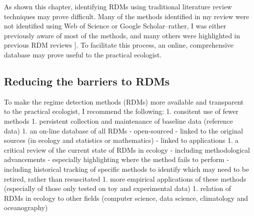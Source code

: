 \documentclass[12pt,twoside,openany]{reedthesis}
\begin{document}
As shown this chapter, identifying RDMs using traditional literature
review techniques may prove difficult. Many of the methods identified in
my review were not identified using Web of Science or Google
Scholar--rather, I was either previously aware of most of the methods,
and many others were highlighted in previous RDM reviews {]}. To
facilitate this process, an online, comprehensive database may prove
useful to the practical ecologist.

\subsection{Reducing the barriers to
RDMs}\label{reducing-the-barriers-to-rdms}

To make the regime detection methods (RDMs) more available and
transparent to the practical ecologist, I recommend the following: 1.
consitent use of fewer methods 1. persistent collection and maintenance
of baseline data (reference data) 1. an on-line database of all RDMs -
open-sourced - linked to the original sources (in ecology and statistics
or mathematics) - linked to applications 1. a critical review of the
current state of RDMs in ecology - including methodological advancements
- especially highlighting where the method fails to perform - including
historical tracking of specific methods to identify which may need to be
retired, rather than resuscitated 1. more empirical applications of
these methods (especially of those only tested on toy and experimental
data) 1. relation of RDMs in ecology to other fields (computer science,
data science, climatology and oceanography)
\end{document}
